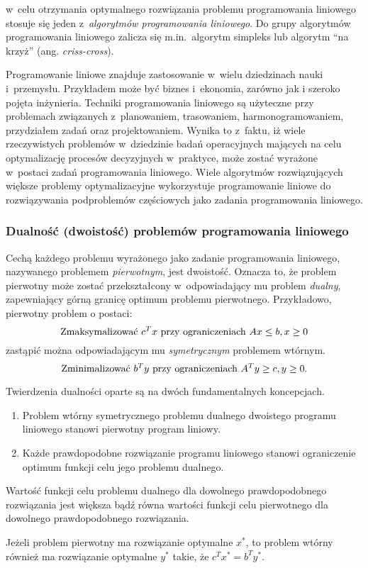 \par{
  w~celu otrzymania optymalnego rozwiązania problemu programowania liniowego
  stosuje się jeden z~\emph{algorytmów programowania liniowego}.
  Do grupy algorytmów programowania liniowego zalicza się m.in.\ algorytm
  simpleks lub algorytm ``na krzyż'' (ang. \emph{criss-cross}).
}
\par{
  Programowanie liniowe znajduje zastosowanie w~wielu dziedzinach nauki i~przemysłu. 
  Przykładem może być biznes i~ekonomia, zarówno jak i szeroko pojęta inżynieria.
  Techniki programowania liniowego są użyteczne przy problemach związanych 
  z~planowaniem, trasowaniem, harmonogramowaniem, przydziałem zadań oraz
  projektowaniem.
  Wynika to z~faktu, iż wiele rzeczywistych problemów w~dziedzinie badań
  operacyjnych mających na celu optymalizację procesów decyzyjnych w~praktyce,
  może zostać wyrażone w~postaci zadań programowania liniowego.
  Wiele algorytmów rozwiązujących większe problemy optymalizacyjne wykorzystuje
  programowanie liniowe do rozwiązywania podproblemów częściowych jako zadania 
  programowania liniowego.
}
\subsubsection{\textbf{Dualność (dwoistość) problemów programowania liniowego}}
\label{sss_lp_duality}
\par{
  Cechą każdego problemu wyrażonego jako zadanie programowania liniowego,
  nazywanego problemem \emph{pierwotnym}, jest dwoistość.
  Oznacza to, że problem pierwotny może zostać przekształcony w~odpowiadający mu
  problem \emph{dualny}, zapewniający górną granicę optimum problemu
  pierwotnego. 
  Przykładowo, pierwotny problem o postaci:\[
  \textnormal{Zmaksymalizować $c^{T}x$ przy ograniczeniach $Ax\leq b, x \geq 0$}
  \]
  zastąpić można odpowiadającym mu \emph{symetrycznym} problemem wtórnym.
  \[
  \textnormal{Zminimalizować $b^{T}y$ przy ograniczeniach $A^{T}y \geq c, y \geq 0$.}
  \]
}
\par{
  Twierdzenia dualności oparte są na dwóch fundamentalnych koncepcjach.
  \begin{enumerate}
    \item Problem wtórny symetrycznego problemu dualnego dwoistego programu
      liniowego stanowi pierwotny program liniowy.
    \item Każde prawdopodobne rozwiązanie programu liniowego stanowi
      ograniczenie optimum funkcji celu jego problemu dualnego.
  \end{enumerate}

  \begin{theorem}
    Wartość funkcji celu problemu dualnego dla dowolnego prawdopodobnego
    rozwiązania jest większa bądź równa wartości funkcji celu pierwotnego dla
    dowolnego prawdopodobnego rozwiązania.
  \end{theorem}
  \begin{theorem}
    Jeżeli problem pierwotny ma rozwiązanie optymalne $x^*$, to problem 
    wtórny również ma rozwiązanie optymalne $y^*$ takie, że $c^{T}x^*=b^{T}y^*$.
  \end{theorem}
}

